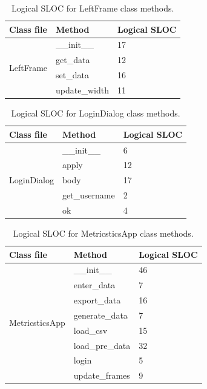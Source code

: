 \documentclass[english,12pt,a4paper]{report}
\begin{document}
	\begin{table}[htbp]
		\centering
		\begin{tabular}{|m{4cm}|m{4cm}|m{2cm}|}
			\hline
			\textbf{Class file} & \textbf{Method} & \textbf{Logical SLOC} \\
			\hline
			\multirow{4}{*}{LeftFrame} & \_\_init\_\_ & 17 \\
			\cline{2-3}
			& get\_data & 12 \\
			\cline{2-3}
			& set\_data & 16 \\
			\cline{2-3}
			& update\_width & 11 \\
			\hline
		\end{tabular}
		\caption{Logical SLOC for LeftFrame class methods.}
	\end{table}
	
	\begin{table}[htbp]
		\centering
		\begin{tabular}{|m{4cm}|m{4cm}|m{2cm}|}
			\hline
			\textbf{Class file} & \textbf{Method} & \textbf{Logical SLOC} \\
			\hline
			\multirow{5}{*}{LoginDialog} & \_\_init\_\_ & 6 \\
			\cline{2-3}
			& apply & 12 \\
			\cline{2-3}
			& body & 17 \\
			\cline{2-3}
			& get\_username & 2 \\
			\cline{2-3}
			& ok & 4 \\
			\hline
		\end{tabular}
		\caption{Logical SLOC for LoginDialog class methods.}
	\end{table}
	
	\begin{table}[htbp]
		\centering
		\begin{tabular}{|m{4cm}|m{4cm}|m{2cm}|}
			\hline
			\textbf{Class file} & \textbf{Method} & \textbf{Logical SLOC} \\
			\hline
			\multirow{8}{*}{MetricsticsApp} & \_\_init\_\_ & 46 \\
			\cline{2-3}
			& enter\_data & 7 \\
			\cline{2-3}
			& export\_data & 16 \\
			\cline{2-3}
			& generate\_data & 7 \\
			\cline{2-3}
			& load\_csv & 15 \\
			\cline{2-3}
			& load\_pre\_data & 32 \\
			\cline{2-3}
			& login & 5 \\
			\cline{2-3}
			& update\_frames & 9 \\
			\hline
		\end{tabular}
		\caption{Logical SLOC for MetricsticsApp class methods.}
	\end{table}
	
\end{document}
